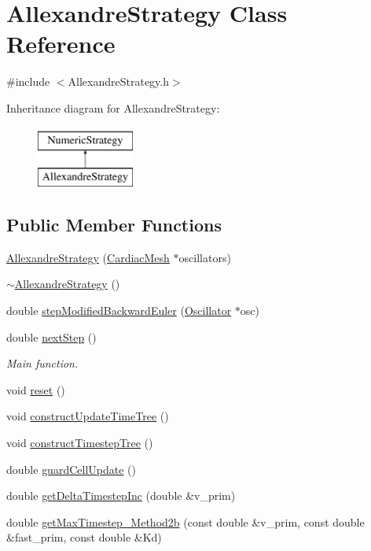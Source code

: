 \hypertarget{class_allexandre_strategy}{\section{Allexandre\+Strategy Class Reference}
\label{class_allexandre_strategy}
}


{\ttfamily \#include $<$Allexandre\+Strategy.\+h$>$}

Inheritance diagram for Allexandre\+Strategy\+:\begin{figure}[H]
\begin{center}
\leavevmode
\includegraphics[height=2.000000cm]{class_allexandre_strategy}
\end{center}
\end{figure}
\subsection*{Public Member Functions}
\begin{DoxyCompactItemize}
\item 
\hyperlink{class_allexandre_strategy_ac14cc10857d943bd555f828fd3c8004d}{Allexandre\+Strategy} (\hyperlink{class_cardiac_mesh}{Cardiac\+Mesh} $\ast$oscillators)
\item 
\hyperlink{class_allexandre_strategy_ac8783c05bbc6e3fea1a99b6ff657fb0d}{$\sim$\+Allexandre\+Strategy} ()
\item 
double \hyperlink{class_allexandre_strategy_a25fe69b84aed988807d10e4b72890d26}{step\+Modified\+Backward\+Euler} (\hyperlink{class_oscillator}{Oscillator} $\ast$osc)
\item 
double \hyperlink{class_allexandre_strategy_a418e280a746b6105eb609cbee6ea99fc}{next\+Step} ()
\begin{DoxyCompactList}\small\item\em Main function. \end{DoxyCompactList}\item 
void \hyperlink{class_allexandre_strategy_a8f657c6d14d76cef3a312fc862c400f7}{reset} ()
\item 
void \hyperlink{class_allexandre_strategy_a19227368bd05ee1d3df2f655387a2dda}{construct\+Update\+Time\+Tree} ()
\item 
void \hyperlink{class_allexandre_strategy_a194aa637bdd931c1f0541cc11e450c79}{construct\+Timestep\+Tree} ()
\item 
double \hyperlink{class_allexandre_strategy_a9ae2720bb39eeb2044a9192a64e0fa95}{guard\+Cell\+Update} ()
\item 
double \hyperlink{class_allexandre_strategy_aae541b33a9b2183437624ba5ecc083a8}{get\+Delta\+Timestep\+Inc} (double \&v\+\_\+prim)
\item 
double \hyperlink{class_allexandre_strategy_adbcde09e77b6c3091fc972ca135d05d4}{get\+Max\+Timestep\+\_\+\+Method2b} (const double \&v\+\_\+prim, const double \&fast\+\_\+prim, const double \&Kd)
\end{DoxyCompactItemize}
